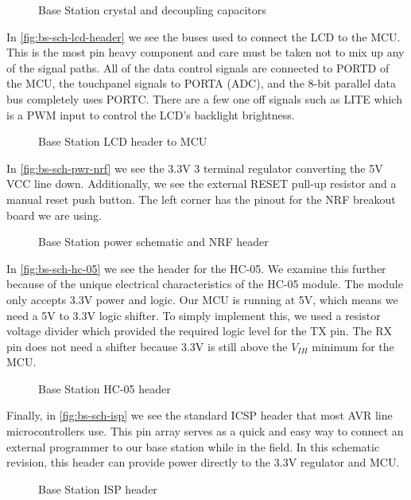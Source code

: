 \documentclass[draft,twocolumn,letterpaper,10pt]{IEEEtran}
\newcommand{\ucffig}[3]{
\begin{figure}[h]
\centering
\makebox[\linewidth][c]{
#2
}
\caption{#3}
\label{#1}
\end{figure}
}
\newcommand{\ucfgfx}[4][scale=1.0]{
\ucffig{#2}{\texttt{[image: \#3]}}{#4}
}
\begin{document}
\ucfgfx[trim=1in 5.0in 5.1in 0.5in,clip,width=\linewidth]
{fig:bs-sch-crystal}{base-station.pdf}{Base Station crystal and decoupling capacitors}

In \autoref{fig:bs-sch-lcd-header} we see the buses used to connect the LCD to the
MCU. This is the most pin heavy component and care must be taken not to mix up
any of the signal paths. All of the data control signals are connected to PORTD
of the MCU, the touchpanel signals to PORTA (ADC), and the 8-bit parallel data
bus completely uses PORTC. There are a few one off signals such as LITE which
is a PWM input to control the LCD's backlight brightness.

\ucfgfx[trim=4.2in 3.3in 2.5in 1.55in,clip,width=\linewidth]
{fig:bs-sch-lcd-header}{base-station.pdf}{Base Station LCD header to MCU}

In \autoref{fig:bs-sch-pwr-nrf} we see the 3.3V 3 terminal regulator converting the
5V VCC line down. Additionally, we see the external RESET pull-up resistor and
a manual reset push button. The left corner has the pinout for the NRF breakout
board we are using.

\ucfgfx[trim=5.9in 1.3in 1.2in 5.0in,clip,width=0.95\linewidth]
{fig:bs-sch-pwr-nrf}{base-station.pdf}{Base Station power schematic and NRF header}

In \autoref{fig:bs-sch-hc-05} we see the header for the HC-05. We examine this
further because of the unique electrical characteristics of the HC-05 module.
The module only accepts 3.3V power and logic. Our MCU is running at 5V,
which means we need a 5V to 3.3V logic shifter. To simply implement this, we
used a resistor voltage divider which provided the required logic level for
the TX pin. The RX pin does not need a shifter because 3.3V is still above the
$V_{IH}$ minimum for the MCU.

\ucfgfx[trim=1.0in 1.0in 7.5in 5.0in,clip,width=0.8\linewidth]
{fig:bs-sch-hc-05}{base-station.pdf}{Base Station HC-05 header}

Finally, in \autoref{fig:bs-sch-isp} we see the standard ICSP header that most
AVR line microcontrollers use. This pin array serves as a quick and easy
way to connect an external programmer to our base station while in the field.
In this schematic revision, this header can provide power directly to the 3.3V
regulator and MCU.

\ucfgfx[trim=1.2in 3.8in 8.2in 4.0in,clip,width=0.6\linewidth]
{fig:bs-sch-isp}{base-station.pdf}{Base Station ISP header}
\end{document}
